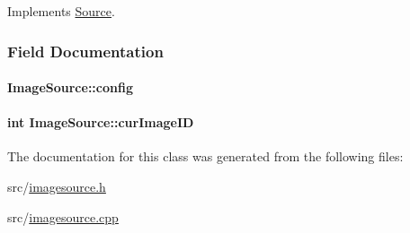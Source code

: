 \-Implements \hyperlink{classSource_acc6f90436f56986b5d261c2408bc1196}{\-Source}.



\subsubsection{\-Field \-Documentation}
\hypertarget{classImageSource_adc74dbed687c026e72ad8819d39d0dc1}{
\paragraph[{config}]{ {\bf \-Image\-Source\-::config}}}\label{classImageSource_adc74dbed687c026e72ad8819d39d0dc1}
\hypertarget{classImageSource_a09b0df783173a472d225e0da85c24d22}{
\paragraph[{cur\-Image\-I\-D}]{\setlength{\rightskip}{0pt plus 5cm}int {\bf \-Image\-Source\-::cur\-Image\-I\-D}}}\label{classImageSource_a09b0df783173a472d225e0da85c24d22}


\-The documentation for this class was generated from the following files\-:\begin{DoxyCompactItemize}
\item 
src/\hyperlink{imagesource_8h}{imagesource.\-h}\item 
src/\hyperlink{imagesource_8cpp}{imagesource.\-cpp}\end{DoxyCompactItemize}
